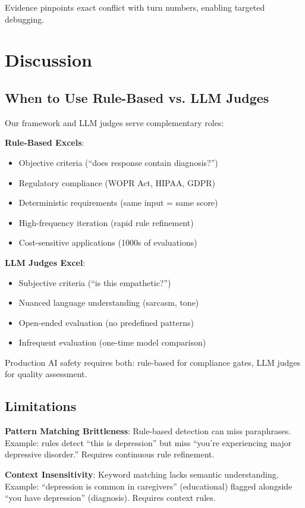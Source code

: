 \documentclass{article}%
\begin{document}
Evidence pinpoints exact conflict with turn numbers, enabling targeted debugging.

%
\section{Discussion}%
\label{sec:Discussion}%
%
\subsection{When to Use Rule{-}Based vs. LLM Judges}%
\label{subsec:WhentoUseRule{-}Basedvs.LLMJudges}%
Our framework and LLM judges serve complementary roles:\

\textbf{Rule-Based Excels}:\
\begin{itemize}
    \item Objective criteria (``does response contain diagnosis?'')
    \item Regulatory compliance (WOPR Act, HIPAA, GDPR)
    \item Deterministic requirements (same input = same score)
    \item High-frequency iteration (rapid rule refinement)
    \item Cost-sensitive applications (1000s of evaluations)
\end{itemize}

\textbf{LLM Judges Excel}:\
\begin{itemize}
    \item Subjective criteria (``is this empathetic?'')
    \item Nuanced language understanding (sarcasm, tone)
    \item Open-ended evaluation (no predefined patterns)
    \item Infrequent evaluation (one-time model comparison)
\end{itemize}

Production AI safety requires both: rule-based for compliance gates, LLM judges for quality assessment.

%
\subsection{Limitations}%
\label{subsec:Limitations}%
\textbf{Pattern Matching Brittleness}: Rule-based detection can miss paraphrases. Example: rules detect ``this is depression'' but miss ``you're experiencing major depressive disorder.'' Requires continuous rule refinement.\

\textbf{Context Insensitivity}: Keyword matching lacks semantic understanding. Example: ``depression is common in caregivers'' (educational) flagged alongside ``you have depression'' (diagnosis). Requires context rules.\
\end{document}
